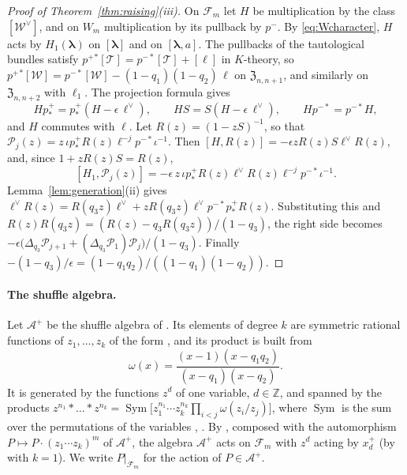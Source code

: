 \documentclass[11pt]{amsart}
\theoremstyle{definition}
\theoremstyle{remark}
\newcommand{\bl}{{\boldsymbol{\lambda}}}         %
\newcommand{\Cartan}[1]{H_{#1}}                  %
\newcommand{\Zc}{\mathfrak Z}
\newcommand{\Hecke}[1]{\Zc_{#1,#1+1}}            %
\newcommand{\HeckeTwo}[1]{\Zc_{#1,#1+2}}         %
\newcommand{\Fock}[1]{\mathcal F_{#1}}            %
\newcommand{\Wsp}[1]{W_{#1}}                     %
\newcommand{\Wc}{\mathcal W}                     %
\newcommand{\Tc}{\mathcal T}                     %
\newcommand{\fix}[1]{[#1]}                       %
\newcommand{\pt}[2]{[#1,#2]}                     %
\newcommand{\pminus}{p^-}                        %
\newcommand{\pplus}{p^+}                         %
\newcommand{\taut}{\ell}                         %
\newcommand{\dtaut}{\taut^{\vee}}                %
\newcommand{\tautone}{\ell_1}
\newcommand{\pulm}{p^{-*}}                       %
\newcommand{\pushp}{p^+_*}                       %
\newcommand{\Shift}{S}                           %
\newcommand{\xplus}[1]{x^+_{#1}}                 %
\newcommand{\Hiso}{\iota}                        %
\newcommand{\Pser}[1]{\mathcal P_{#1}}           %
\newcommand{\Dq}{\Delta_{q_3}}                   %
\newcommand{\Shuf}{\mathcal A^{+}}               %
\DeclareMathOperator{\Sym}{Sym}
\begin{document}
\begin{proof}[Proof of Theorem~\ref{thm:raising}(iii)]
On \(\Fock{m}\) let \(H\) be multiplication by the class \([\Wc^\vee]\), and on
\(\Wsp{m}\) multiplication by its pullback by \(\pminus\). By \eqref{eq:Wcharacter},
\(H\) acts by \(\Cartan{1}(\bl)\) on \(\fix{\bl}\) and on \(\pt{\bl}{a}\).
The pullbacks of the tautological bundles satisfy
\(\pplus{}^*[\Tc]=\pulm[\Tc]+[\taut]\) in \(K\)-theory, so
\(\pplus{}^*[\Wc]=\pulm[\Wc]-(1-q_1)(1-q_2)\,\taut\) on \(\Hecke{n}\), and similarly on
\(\HeckeTwo{n}\) with \(\tautone\). The projection formula gives
\[
 H\pushp=\pushp(H-\epsilon\,\dtaut),\qquad H\Shift=\Shift(H-\epsilon\,\dtaut),\qquad
 H\pulm=\pulm H,
\]
and \(H\) commutes with \(\taut\). Let \(R(z)=(1-z\Shift)^{-1}\), so that
\(\Pser{j}(z)=z\,\Hiso\pushp R(z)\taut^{-j}\pulm\Hiso^{-1}\). Then
\([H,R(z)]=-\epsilon zR(z)\Shift\dtaut R(z)\), and, since \(1+zR(z)\Shift=R(z)\),
\[
 [\Cartan{1},\Pser{j}(z)]
 =-\epsilon\,z\,\Hiso\pushp R(z)\dtaut R(z)\taut^{-j}\pulm\Hiso^{-1}.
\]
Lemma~\ref{lem:generation}(ii) gives
\(\dtaut R(z)=R(q_3z)\dtaut+zR(q_3z)\dtaut\pulm\pushp R(z)\). Substituting this and
\(R(z)R(q_3z)=(R(z)-q_3R(q_3z))/(1-q_3)\), the right side becomes
\(-\epsilon\bigl(\Dq\Pser{j+1}+(\Dq\Pser{1})\Pser{j}\bigr)/(1-q_3)\). Finally
\(-(1-q_3)/\epsilon=(1-q_1q_2)/((1-q_1)(1-q_2))\).
\end{proof}

\paragraph{The shuffle algebra.}
Let \(\Shuf\) be the shuffle algebra of \cite[Section~4.2]{N1}. Its elements of degree
\(k\) are symmetric rational functions of \(z_1,\dots,z_k\) of the form
\cite[(4.4)]{N1}, and its product \cite[(4.2)]{N1} is built from
\[
 \omega(x)=\frac{(x-1)(x-q_1q_2)}{(x-q_1)(x-q_2)}.
\]
It is generated by the functions \(z^d\) of one variable, \(d\in\mathbb Z\), and spanned
by the products
\(z^{n_1}*\dots*z^{n_k}=\Sym\bigl[z_1^{n_1}\cdots z_k^{n_k}\prod_{i<j}\omega(z_i/z_j)\bigr]\),
where \(\Sym\) is the sum over the permutations of the variables \cite[Section~4.2
and (4.13)]{N1}, \cite{Negutshuffle}. By \cite[Theorem~4.7]{N1}, composed with the
automorphism \(P\mapsto P\cdot(z_1\cdots z_k)^m\) of \(\Shuf\), the algebra \(\Shuf\) acts
on \(\Fock{m}\) with \(z^d\) acting by \(\xplus{d}\) (by \cite[Theorem~4.10]{N1} with
\(k=1\)). We write \(P|_{\Fock{m}}\) for the action of \(P\in\Shuf\).
\end{document}
